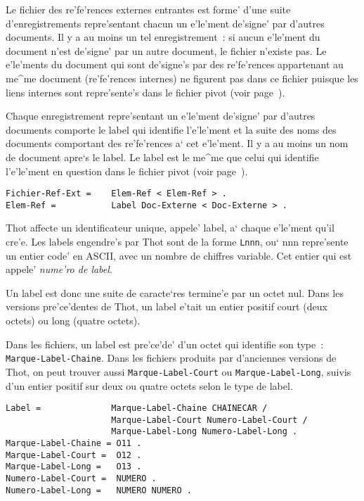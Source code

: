 Le fichier des re'fe'rences externes entrantes est forme' d'une suite
d'enregistrements repre'sentant chacun un e'le'ment de'signe'
par d'autres documents. Il y a au moins un tel enregistrement~: si aucun
e'le'ment du document n'est de'signe' par un autre document, le fichier
n'existe pas.
Le e'le'ments du document qui sont de'signe's par des re'fe'rences appartenant
au me^me document (re'fe'rences internes) ne figurent pas dans ce fichier
puisque les liens internes sont repre'sente's dans le fichier pivot (voir
page~\pageref{refer}).

Chaque enregistrement repre'sentant un e'le'ment de'signe' par d'autres
documents comporte le label qui identifie l'e'le'ment et la suite des
noms des documents comportant des re'fe'rences a` cet e'le'ment.
Il y a au moins un nom de document apre`s le label.
Le label est le me^me que celui qui identifie l'e'le'ment en question dans
le fichier pivot (voir page~\pageref{labelelem}).

\begin{verbatim}
Fichier-Ref-Ext =    Elem-Ref < Elem-Ref > .
Elem-Ref =           Label Doc-Externe < Doc-Externe > .
\end{verbatim}

\label{label}
Thot affecte un identificateur unique, appele' label, a` chaque e'le'ment
qu'il cre'e. Les labels engendre's par Thot sont de la forme {\tt Lnnn},
ou` nnn repre'sente un entier code' en ASCII, avec un nombre de
chiffres variable. Cet entier qui est appele' {\em nume'ro de label}.

Un label est donc une suite de caracte`res termine'e par un octet nul.
Dans les versions pre'ce'dentes de Thot, un label e'tait
un entier positif court (deux octets) ou long (quatre octets).

Dans les fichiers, un label est pre'ce'de' d'un octet qui identifie son type~:
{\tt Marque-Label-Chaine}. Dans les fichiers produits par d'anciennes
versions de Thot, on peut trouver aussi {\tt Marque-Label-Court} ou
{\tt Marque-Label-Long}, suivis d'un entier positif sur deux ou quatre
octets selon le type de label.

\begin{verbatim}
Label =              Marque-Label-Chaine CHAINECAR /
                     Marque-Label-Court Numero-Label-Court /
                     Marque-Label-Long Numero-Label-Long .
Marque-Label-Chaine = O11 .
Marque-Label-Court =  O12 .
Marque-Label-Long =   O13 .
Numero-Label-Court =  NUMERO .
Numero-Label-Long =   NUMERO NUMERO .
\end{verbatim}

